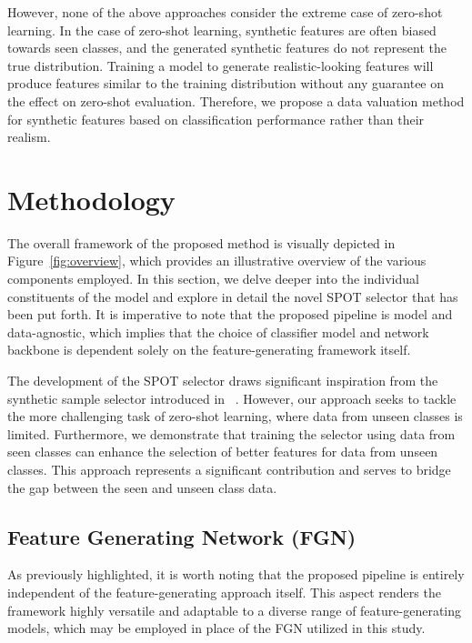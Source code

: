 \documentclass[10pt,twocolumn,letterpaper]{article}
\begin{document}
However, none of the above approaches consider the extreme case of zero-shot learning. In the case of zero-shot learning, synthetic features are often biased towards seen classes, and the generated synthetic features do not represent the true distribution. Training a model to generate realistic-looking features will produce features similar to the training distribution without any guarantee on the effect on zero-shot evaluation. Therefore, we propose a data valuation method for synthetic features based on classification performance rather than their realism.



\section{Methodology}
\label{sec:method}

The overall framework of the proposed method is visually depicted in Figure~\ref{fig:overview}, which provides an illustrative overview of the various components employed. In this section, we delve deeper into the individual constituents of the model and explore in detail the novel SPOT selector that has been put forth. It is imperative to note that the proposed pipeline is model and data-agnostic, which implies that the choice of classifier model and network backbone is dependent solely on the feature-generating framework itself.

The development of the SPOT selector draws significant inspiration from the synthetic sample selector introduced in ~\cite{ye2020synthetic}. However, our approach seeks to tackle the more challenging task of zero-shot learning, where data from unseen classes is limited. Furthermore, we demonstrate that training the selector using data from seen classes can enhance the selection of better features for data from unseen classes. This approach represents a significant contribution and serves to bridge the gap between the seen and unseen class data.

\subsection{Feature Generating Network (FGN)}
As previously highlighted, it is worth noting that the proposed pipeline is entirely independent of the feature-generating approach itself. This aspect renders the framework highly versatile and adaptable to a diverse range of feature-generating models, which may be employed in place of the FGN utilized in this study.
\end{document}
